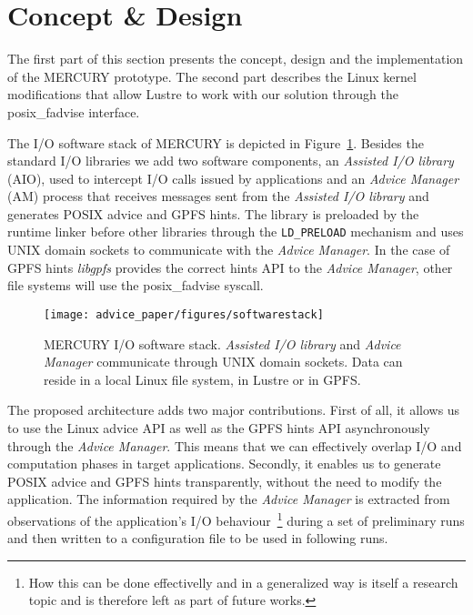 \section{Concept \& Design}
\label{sec: concept}
The first part of this section presents the concept, design and the implementation of the MERCURY prototype. The second part describes the Linux kernel modifications that allow Lustre to work with our solution through the posix\_fadvise interface.

The I/O software stack of MERCURY is depicted in Figure~\ref{figure: softwarestack}. Besides the standard I/O libraries we add two software components, an \textit{Assisted I/O library} (AIO), used to intercept I/O calls issued by applications and an \textit{Advice Manager} (AM) process that receives messages sent from the \textit{Assisted I/O library} and generates POSIX advice and GPFS hints. The library is preloaded by the runtime linker before other libraries through the \texttt{LD\_PRELOAD} mechanism and uses UNIX domain sockets to communicate with the \textit{Advice Manager}. In the case of GPFS hints \textit{libgpfs} provides the correct hints API to the \textit{Advice Manager}, other file systems will use the posix\_fadvise syscall.

\begin{figure}[!htb]
  \centering
  \texttt{[image: advice\_paper/figures/softwarestack]}
  \caption{MERCURY I/O software stack. \textit{Assisted I/O library} and \textit{Advice Manager} communicate through UNIX domain sockets. %
  Data can reside in a local Linux file system, in Lustre or in GPFS.}
  \label{figure: softwarestack}
\end{figure}

The proposed architecture adds two major contributions. First of all, it allows us to use the Linux advice API as well as the GPFS hints API asynchronously through the \textit{Advice Manager}. This means that we can effectively overlap I/O and computation phases in target applications. Secondly, it enables us to generate POSIX advice and GPFS hints transparently, without the need to modify the application. The information required by the \textit{Advice Manager} is extracted from observations of the application's I/O behaviour~\footnote{How this can be done effectivelly and in a generalized way is itself a research topic and is therefore left as part of future works.} during a set of preliminary runs and then written to a configuration file to be used in following runs.


